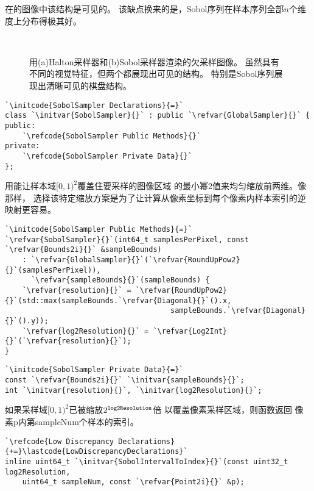 在的图像中该结构是可见的。
该缺点换来的是，Sobol序列在样本序列全部$n$个维度上分布得极其好。
\begin{figure}[htbp]
    \centering
    \\
    \caption{用(a)Halton采样器和(b)Sobol采样器渲染的欠采样图像。
        虽然具有不同的视觉特征，但两个都展现出可见的结构。
        特别是Sobol序列展现出清晰可见的棋盘结构。}
    \label{fig:7.37}
\end{figure}

\begin{lstlisting}
`\initcode{SobolSampler Declarations}{=}`
class `\initvar{SobolSampler}{}` : public `\refvar{GlobalSampler}{}` {
public:
    `\refcode{SobolSampler Public Methods}{}`
private:
    `\refcode{SobolSampler Private Data}{}`
};
\end{lstlisting}

用能让样本域$[0,1)^2$覆盖住要采样的图像区域
的最小幂2值来均匀缩放前两维。像那样，
选择该特定缩放方案是为了让计算从像素坐标到每个像素内样本索引的逆映射更容易。
\begin{lstlisting}
`\initcode{SobolSampler Public Methods}{=}`
`\refvar{SobolSampler}{}`(int64_t samplesPerPixel, const `\refvar{Bounds2i}{}` &sampleBounds)
    : `\refvar{GlobalSampler}{}`(`\refvar{RoundUpPow2}{}`(samplesPerPixel)),
      `\refvar{sampleBounds}{}`(sampleBounds) {
    `\refvar{resolution}{}` = `\refvar{RoundUpPow2}{}`(std::max(sampleBounds.`\refvar{Diagonal}{}`().x,
                                      sampleBounds.`\refvar{Diagonal}{}`().y));
    `\refvar{log2Resolution}{}` = `\refvar{Log2Int}{}`(`\refvar{resolution}{}`);
}
\end{lstlisting}
\begin{lstlisting}
`\initcode{SobolSampler Private Data}{=}`
const `\refvar{Bounds2i}{}` `\initvar{sampleBounds}{}`;
int `\initvar{resolution}{}`, `\initvar{log2Resolution}{}`;
\end{lstlisting}

如果采样域$[0,1)^2$已被缩放$2^{\text{\ttfamily log2Resolution}}$倍
以覆盖像素采样区域，则函数返回
像素{\ttfamily p}内第{\ttfamily sampleNum}个样本的索引。
\begin{lstlisting}
`\refcode{Low Discrepancy Declarations}{+=}\lastcode{LowDiscrepancyDeclarations}`
inline uint64_t `\initvar{SobolIntervalToIndex}{}`(const uint32_t log2Resolution,
    uint64_t sampleNum, const `\refvar{Point2i}{}` &p);
\end{lstlisting}

